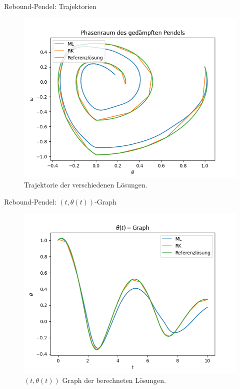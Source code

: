 \begin{frame}{Rebound-Pendel: Trajektorien}
    \begin{figure}
        \centering
        \includegraphics[scale=0.5]{images/Rebound_plots/reboundpendulumtrajectories_}
        \caption{Trajektorie der verschiedenen Lösungen.}
        \label{fig:rebound-trajectories}
    \end{figure}
\end{frame}

\begin{frame}{Rebound-Pendel: $(t,\theta(t))$-Graph}
    \begin{figure}
        \centering
        \includegraphics[scale=0.5]{images/Rebound_plots/reboundpendulumtrajectories_in_time_}
        \caption{$(t, \theta(t))$ Graph der berechneten Lösungen.}
        \label{fig:rebound-trajectories-in-time}
    \end{figure}
\end{frame}

